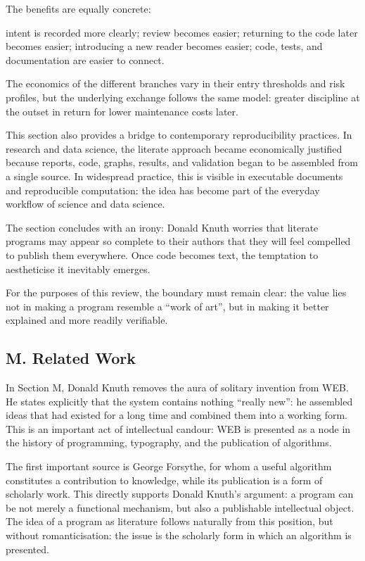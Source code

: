 \documentclass{ZGJournalArticle_2026}
\newenvironment{Shaded}{}{}
\newcommand{\NormalTok}[1]{#1}
\begin{document}
The benefits are equally concrete:

\begin{Shaded}
\begin{Highlighting}[]
\NormalTok{intent is recorded more clearly;}
\NormalTok{review becomes easier;}
\NormalTok{returning to the code later becomes easier;}
\NormalTok{introducing a new reader becomes easier;}
\NormalTok{code, tests, and documentation are easier to connect.}
\end{Highlighting}
\end{Shaded}

The economics of the different branches vary in their entry thresholds
and risk profiles, but the underlying exchange follows the same model:
greater discipline at the outset in return for lower maintenance costs
later.

This section also provides a bridge to contemporary reproducibility
practices. In research and data science, the literate approach became
economically justified because reports, code, graphs, results, and
validation began to be assembled from a single source. In widespread
practice, this is visible in executable documents and reproducible
computation: the idea has become part of the everyday workflow of
science and data science.

The section concludes with an irony: Donald Knuth worries that literate
programs may appear so complete to their authors that they will feel
compelled to publish them everywhere. Once code becomes text, the
temptation to aestheticise it inevitably emerges.

For the purposes of this review, the boundary must remain clear: the
value lies not in making a program resemble a ``work of art'', but in
making it better explained and more readily verifiable.

\subsection{M. Related Work}\label{m.-related-work}

In Section M, Donald Knuth removes the aura of solitary invention from
WEB. He states explicitly that the system contains nothing ``really
new'': he assembled ideas that had existed for a long time and combined
them into a working form. This is an important act of intellectual
candour: WEB is presented as a node in the history of programming,
typography, and the publication of algorithms.

The first important source is George Forsythe, for whom a useful
algorithm constitutes a contribution to knowledge, while its publication
is a form of scholarly work. This directly supports Donald Knuth's
argument: a program can be not merely a functional mechanism, but also a
publishable intellectual object. The idea of a program as literature
follows naturally from this position, but without romanticisation: the
issue is the scholarly form in which an algorithm is presented.
\end{document}
